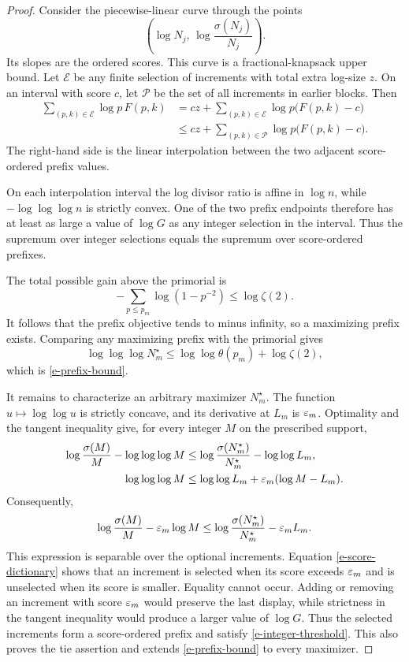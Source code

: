 \begin{proof}
Consider the piecewise-linear curve through the points
\[
    \left(
        \log N_j,\,
        \log\frac{\sigma(N_j)}{N_j}
    \right).
\]
Its slopes are the ordered scores. This curve is a fractional-knapsack
upper bound. Let \(\mathcal E\) be any finite selection of increments
with total extra log-size \(z\). On an interval with score \(c\), let
\(\mathcal P\) be the set of all increments in earlier blocks. Then
\[
\begin{aligned}
    \sum_{(p,k)\in\mathcal E}\log p\,F(p,k)
    &=
    cz+
    \sum_{(p,k)\in\mathcal E}
    \log p\bigl(F(p,k)-c\bigr)\\
    &\leq
    cz+
    \sum_{(p,k)\in\mathcal P}
    \log p\bigl(F(p,k)-c\bigr).
\end{aligned}
\]
The right-hand side is the linear interpolation between the two adjacent
score-ordered prefix values.

On each interpolation interval the log divisor ratio is affine in
\(\log n\), while \(-\log\log\log n\) is strictly convex. One of the two
prefix endpoints therefore has at least as large a value of \(\log G\)
as any integer selection in the interval. Thus the supremum over integer
selections equals the supremum over score-ordered prefixes.

The total possible gain above the primorial is
\[
    -\sum_{p\leq p_m}\log(1-p^{-2})
    \leq
    \log\zeta(2).
\]
It follows that the prefix objective tends to minus infinity, so a
maximizing prefix exists. Comparing any maximizing prefix with the
primorial gives
\[
    \log\log\log N_m^\star
    \leq
    \log\log\theta(p_m)+\log\zeta(2),
\]
which is \eqref{e-prefix-bound}.

It remains to characterize an arbitrary maximizer \(N_m^\star\). The function
\(u\mapsto\log\log u\) is strictly concave, and its derivative at \(L_m\)
is \(\varepsilon_m\). Optimality and the tangent inequality give, for every
integer \(M\) on the prescribed support,
\[
\begin{aligned}
    \log\frac{\sigma(M)}M-\log\log\log M
    &\leq
    \log\frac{\sigma(N_m^\star)}{N_m^\star}-\log\log L_m,\\
    \log\log\log M
    &\leq
    \log\log L_m+\varepsilon_m(\log M-L_m).
\end{aligned}
\]
Consequently,
\[
    \log\frac{\sigma(M)}M-\varepsilon_m\log M
    \leq
    \log\frac{\sigma(N_m^\star)}{N_m^\star}-\varepsilon_m L_m.
\]
This expression is separable over the optional increments. Equation
\eqref{e-score-dictionary} shows that an increment is selected when its
score exceeds \(\varepsilon_m\) and is unselected when its score is smaller.
Equality cannot occur. Adding or removing an increment with score
\(\varepsilon_m\) would preserve the last display, while strictness in the
tangent inequality would produce a larger value of \(\log G\). Thus the
selected increments form a score-ordered prefix and satisfy
\eqref{e-integer-threshold}. This also proves the tie assertion and
extends \eqref{e-prefix-bound} to every maximizer.
\end{proof}

